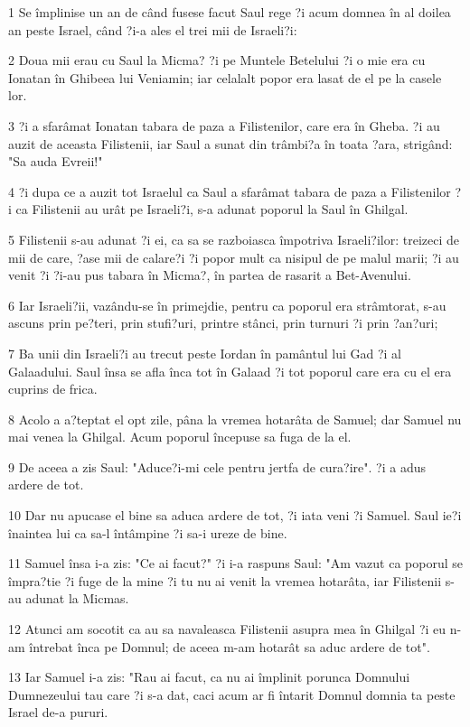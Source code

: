 \par 1 Se împlinise un an de când fusese facut Saul rege ?i acum domnea în al doilea an peste Israel, când ?i-a ales el trei mii de Israeli?i:
\par 2 Doua mii erau cu Saul la Micma? ?i pe Muntele Betelului ?i o mie era cu Ionatan în Ghibeea lui Veniamin; iar celalalt popor era lasat de el pe la casele lor.
\par 3 ?i a sfarâmat Ionatan tabara de paza a Filistenilor, care era în Gheba. ?i au auzit de aceasta Filistenii, iar Saul a sunat din trâmbi?a în toata ?ara, strigând: "Sa auda Evreii!"
\par 4 ?i dupa ce a auzit tot Israelul ca Saul a sfarâmat tabara de paza a Filistenilor ?i ca Filistenii au urât pe Israeli?i, s-a adunat poporul la Saul în Ghilgal.
\par 5 Filistenii s-au adunat ?i ei, ca sa se razboiasca împotriva Israeli?ilor: treizeci de mii de care, ?ase mii de calare?i ?i popor mult ca nisipul de pe malul marii; ?i au venit ?i ?i-au pus tabara în Micma?, în partea de rasarit a Bet-Avenului.
\par 6 Iar Israeli?ii, vazându-se în primejdie, pentru ca poporul era strâmtorat, s-au ascuns prin pe?teri, prin stufi?uri, printre stânci, prin turnuri ?i prin ?an?uri;
\par 7 Ba unii din Israeli?i au trecut peste Iordan în pamântul lui Gad ?i al Galaadului. Saul însa se afla înca tot în Galaad ?i tot poporul care era cu el era cuprins de frica.
\par 8 Acolo a a?teptat el opt zile, pâna la vremea hotarâta de Samuel; dar Samuel nu mai venea la Ghilgal. Acum poporul începuse sa fuga de la el.
\par 9 De aceea a zis Saul: "Aduce?i-mi cele pentru jertfa de cura?ire". ?i a adus ardere de tot.
\par 10 Dar nu apucase el bine sa aduca ardere de tot, ?i iata veni ?i Samuel. Saul ie?i înaintea lui ca sa-l întâmpine ?i sa-i ureze de bine.
\par 11 Samuel însa i-a zis: "Ce ai facut?" ?i i-a raspuns Saul: "Am vazut ca poporul se împra?tie ?i fuge de la mine ?i tu nu ai venit la vremea hotarâta, iar Filistenii s-au adunat la Micmas.
\par 12 Atunci am socotit ca au sa navaleasca Filistenii asupra mea în Ghilgal ?i eu n-am întrebat înca pe Domnul; de aceea m-am hotarât sa aduc ardere de tot".
\par 13 Iar Samuel i-a zis: "Rau ai facut, ca nu ai împlinit porunca Domnului Dumnezeului tau care ?i s-a dat, caci acum ar fi întarit Domnul domnia ta peste Israel de-a pururi.
